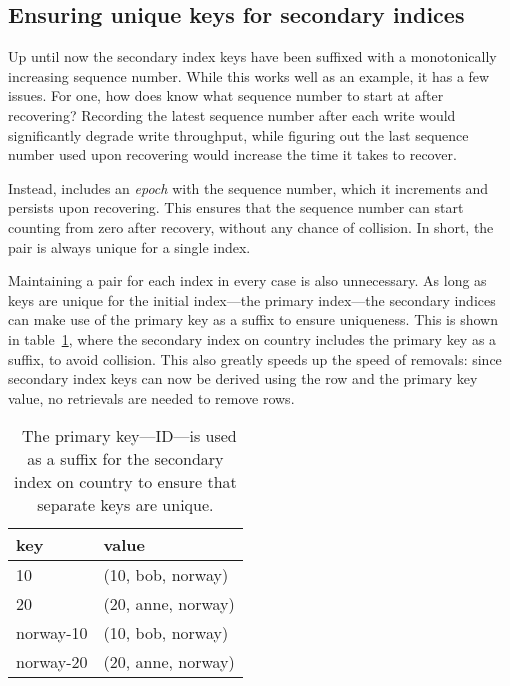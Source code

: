 \subsection{Ensuring unique keys for secondary indices}

Up until now the secondary index keys have been suffixed with a monotonically
increasing sequence number. While this works well as an example, it has a few
issues. For one, how does  know what sequence number to
start at after recovering? Recording the latest sequence number after each write
would significantly degrade write throughput, while figuring out the last
sequence number used upon recovering would increase the time it takes to
recover.

Instead,  includes an \textit{epoch} with the sequence
number, which it increments and persists upon recovering. This ensures that the
sequence number can start counting from zero after recovery, without any chance
of collision. In short, the pair  is always
unique for a single index.

Maintaining a  pair for each index in every case
is also unnecessary. As long as keys are unique for the initial index---the
primary index---the secondary indices can make use of the primary key as a
suffix to ensure uniqueness. This is shown in table~\ref{table:unique-suffix},
where the secondary index on country includes the primary key as a suffix, to
avoid collision. This also greatly speeds up the speed of removals: since
secondary index keys can now be derived using the row and the primary key value,
no retrievals are needed to remove rows.

\begin{table}[H]
  \centering
  \begin{tabular}{l l}
    \toprule
    \textbf{key} & \textbf{value} \\ \midrule
    10 & (10, bob, norway) \\ \midrule
    20 & (20, anne, norway) \\ \midrule
    norway-10 & (10, bob, norway) \\ \midrule
    norway-20 & (20, anne, norway) \\ \midrule
  \end{tabular}

  \caption{\
    The primary key---ID---is used as a suffix for the secondary index on
    country to ensure that separate keys are unique.
  }\label{table:unique-suffix}
\end{table}


